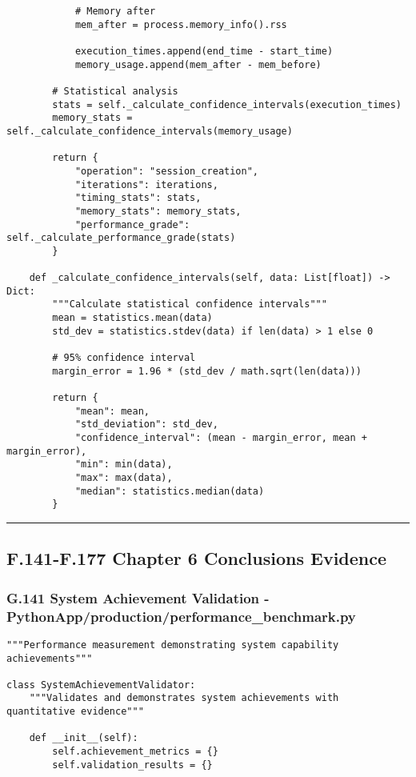\documentclass[11pt,a4paper]{article}
\begin{document}
{{\begin{verbatim}
            # Memory after
            mem_after = process.memory_info().rss

            execution_times.append(end_time - start_time)
            memory_usage.append(mem_after - mem_before)

        # Statistical analysis
        stats = self._calculate_confidence_intervals(execution_times)
        memory_stats = self._calculate_confidence_intervals(memory_usage)

        return {
            "operation": "session_creation",
            "iterations": iterations,
            "timing_stats": stats,
            "memory_stats": memory_stats,
            "performance_grade": self._calculate_performance_grade(stats)
        }

    def _calculate_confidence_intervals(self, data: List[float]) -> Dict:
        """Calculate statistical confidence intervals"""
        mean = statistics.mean(data)
        std_dev = statistics.stdev(data) if len(data) > 1 else 0

        # 95% confidence interval
        margin_error = 1.96 * (std_dev / math.sqrt(len(data)))

        return {
            "mean": mean,
            "std_deviation": std_dev,
            "confidence_interval": (mean - margin_error, mean + margin_error),
            "min": min(data),
            "max": max(data),
            "median": statistics.median(data)
        }
\end{verbatim}

\hrule

\subsection{F.141-F.177 Chapter 6 Conclusions Evidence}

\subsubsection{G.141 System Achievement Validation - PythonApp/production/performance_benchmark.py}

\begin{verbatim}
"""Performance measurement demonstrating system capability achievements"""

class SystemAchievementValidator:
    """Validates and demonstrates system achievements with quantitative evidence"""

    def __init__(self):
        self.achievement_metrics = {}
        self.validation_results = {}


\end{verbatim}}}
\end{document}
